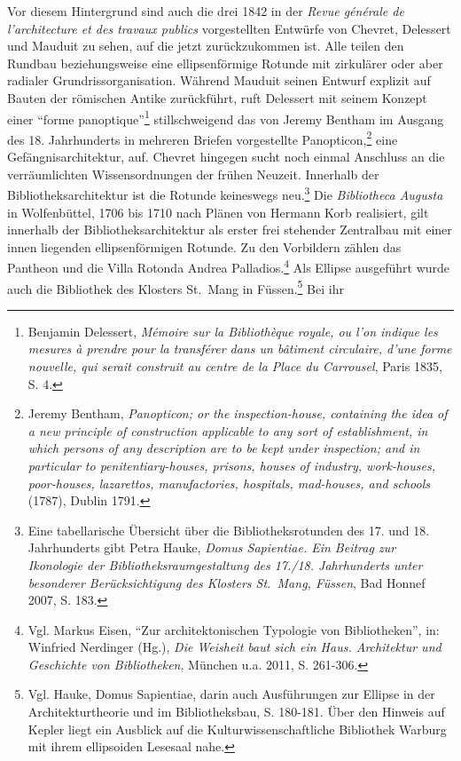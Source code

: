 Vor diesem Hintergrund sind auch die drei 1842 in der \emph{Revue
générale de l'architecture et des travaux publics} vorgestellten
Entwürfe von Chevret, Delessert und Mauduit zu sehen, auf die jetzt
zurückzukommen ist. Alle teilen den Rundbau beziehungsweise eine
ellipsenförmige Rotunde mit zirkulärer oder aber radialer
Grundrissorganisation. Während Mauduit seinen Entwurf explizit auf
Bauten der römischen Antike zurückführt, ruft Delessert mit seinem
Konzept einer \enquote{forme panoptique}\footnote{Benjamin Delessert,
  \emph{Mémoire sur la Bibliothèque royale, ou l'on indique les mesures
  à prendre pour la transférer dans un bâtiment circulaire, d'une forme
  nouvelle, qui serait construit au centre de la Place du Carrousel},
  Paris 1835, S. 4.} stillschweigend das von Jeremy Bentham im Ausgang
des 18. Jahrhunderts in mehreren Briefen vorgestellte
Panopticon,\footnote{Jeremy Bentham, \emph{Panopticon; or the
  inspection-house, containing the idea of a new principle of
  construction applicable to any sort of establishment, in which persons
  of any description are to be kept under inspection; and in particular
  to penitentiary-houses, prisons, houses of industry, work-houses,
  poor-houses, lazarettos, manufactories, hospitals, mad-houses, and
  schools} (1787), Dublin 1791.} eine Gefängnisarchitektur, auf. Chevret
hingegen sucht noch einmal Anschluss an die verräumlichten
Wissensordnungen der frühen Neuzeit. Innerhalb der
Bibliotheksarchitektur ist die Rotunde keineswegs neu.\footnote{Eine
  tabellarische Übersicht über die Bibliotheksrotunden des 17. und 18.
  Jahrhunderts gibt Petra Hauke, \emph{Domus Sapientiae. Ein Beitrag zur
  Ikonologie der Bibliotheksraumgestaltung des 17./18. Jahrhunderts
  unter besonderer Berücksichtigung des Klosters St.~Mang, Füssen}, Bad
  Honnef 2007, S. 183.} Die \emph{Bibliotheca Augusta} in Wolfenbüttel,
1706 bis 1710 nach Plänen von Hermann Korb realisiert, gilt innerhalb
der Bibliotheksarchitektur als erster frei stehender Zentralbau mit
einer innen liegenden ellipsenförmigen Rotunde. Zu den Vorbildern zählen
das Pantheon und die Villa Rotonda Andrea Palladios.\footnote{Vgl.
  Markus Eisen, \enquote{Zur architektonischen Typologie von
  Bibliotheken}, in: Winfried Nerdinger (Hg.), \emph{Die Weisheit baut
  sich ein Haus. Architektur und Geschichte von Bibliotheken}, München
  u.a. 2011, S. 261-306.} Als Ellipse ausgeführt wurde auch die
Bibliothek des Klosters St.~Mang in Füssen.\footnote{Vgl. Hauke, Domus
  Sapientiae, darin auch Ausführungen zur Ellipse in der
  Architekturtheorie und im Bibliotheksbau, S. 180-181. Über den Hinweis
  auf Kepler liegt ein Ausblick auf die Kulturwissenschaftliche
  Bibliothek Warburg mit ihrem ellipsoiden Lesesaal nahe.} Bei ihr
